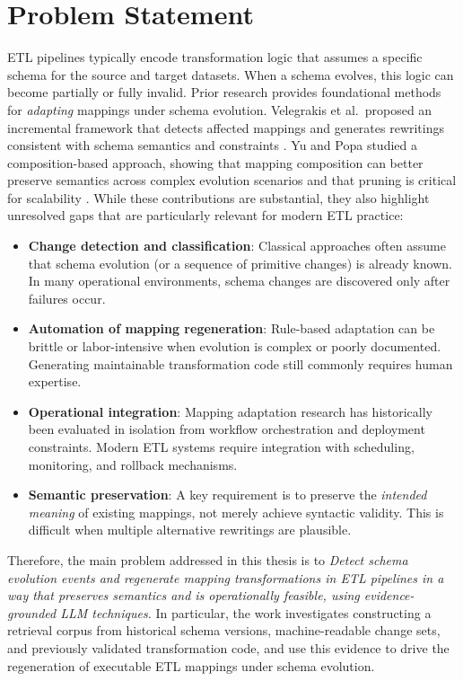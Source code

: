 \section{Problem Statement}
\label{sec:intro-problem}

ETL pipelines typically encode transformation logic that assumes a specific schema for the source and target datasets. When a schema evolves, this logic can become partially or fully invalid. Prior research provides foundational methods for \emph{adapting} mappings under schema evolution. Velegrakis et al.\ proposed an incremental framework that detects affected mappings and generates rewritings consistent with schema semantics and constraints \cite{velegrakis2003mapping}. Yu and Popa studied a composition-based approach, showing that mapping composition can better preserve semantics across complex evolution scenarios and that pruning is critical for scalability \cite{yu2005semantic}. While these contributions are substantial, they also highlight unresolved gaps that are particularly relevant for modern ETL practice:

\begin{itemize}
  \item \textbf{Change detection and classification}: Classical approaches often assume that schema evolution (or a sequence of primitive changes) is already known. In many operational environments, schema changes are discovered only after failures occur.
  \item \textbf{Automation of mapping regeneration}: Rule-based adaptation can be brittle or labor-intensive when evolution is complex or poorly documented. Generating maintainable transformation code still commonly requires human expertise.
  \item \textbf{Operational integration}: Mapping adaptation research has historically been evaluated in isolation from workflow orchestration and deployment constraints. Modern ETL systems require integration with scheduling, monitoring, and rollback mechanisms.
  \item \textbf{Semantic preservation}: A key requirement is to preserve the \emph{intended meaning} of existing mappings, not merely achieve syntactic validity. This is difficult when multiple alternative rewritings are plausible.
\end{itemize}

Therefore, the main problem addressed in this thesis is to \emph{Detect schema evolution events and regenerate mapping transformations in ETL pipelines in a way that preserves semantics and is operationally feasible, using evidence-grounded LLM techniques.} In particular, the work investigates constructing a retrieval corpus from historical schema versions, machine-readable change sets, and previously validated transformation code, and use this evidence to drive the regeneration of executable ETL mappings under schema evolution.


